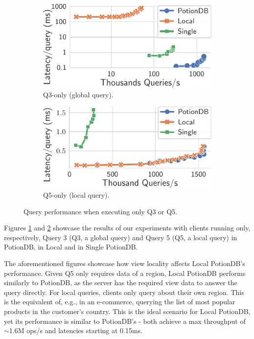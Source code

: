 \documentclass[sigplan,review,anonymous]{acmart}
\begin{document}
\begin{figure}
	\centering
	\begin{subfigure}{.49\linewidth}
		\includegraphics[width=1\linewidth]{singleQuery/q3_latency}
		\caption{Q3-only (global query).}
		\label{fig:q3_tc}
	\end{subfigure}%
	\hspace*{0.2em}
	\begin{subfigure}{.49\linewidth}
		\includegraphics[width=1\linewidth]{singleQuery/q5_latency}
		\caption{Q5-only (local query).}
		\label{fig:q5_tc}
	\end{subfigure}%
	\vspace*{-0.55em}
	\caption{Query performance when executing only Q3 or Q5.}
	\label{fig:q3_q5_tc}
	\vspace*{-1.1em}
\end{figure}

Figures \ref{fig:q3_tc} and \ref{fig:q5_tc} showcase the results of our experiments with clients running only, respectively, Query 3 (Q3, a global query) and Query 5 (Q5, a local query) in PotionDB, in Local and in Single PotionDB.

The aforementioned figures showcase how view locality affects Local PotionDB's performance.
Given Q5 only requires data of a region, Local PotionDB performs similarly to PotionDB, as the server has the required view data to answer the query directly.
For local queries, clients only query about their own region.
This is the equivalent of, e.g., in an e-commerce, querying the list of most popular products in the customer's country.
This is the ideal scenario for Local PotionDB, yet its performance is similar to PotionDB's - both achieve a max throughput of $\sim$1.6M ops/s and latencies starting at 0.15ms.
\end{document}
